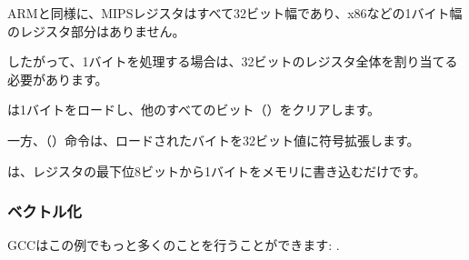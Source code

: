 ARMと同様に、MIPSレジスタはすべて32ビット幅であり、x86などの1バイト幅のレジスタ部分はありません。

したがって、1バイトを処理する場合は、32ビットのレジスタ全体を割り当てる必要があります。

は1バイトをロードし、他のすべてのビット（）をクリアします。

一方、（）命令は、ロードされたバイトを32ビット値に符号拡張します。

は、レジスタの最下位8ビットから1バイトをメモリに書き込むだけです。

\subsubsection{ベクトル化}

\Optimizing GCCはこの例でもっと多くのことを行うことができます: .
